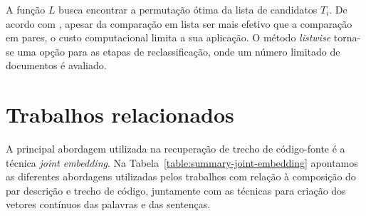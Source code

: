 A função $L$ busca encontrar a permutação ótima da lista de candidatos $T_{i}$. De acordo com \cite{guo-deep-look-into-neural-ranking-models:2019}, apesar da comparação em lista ser mais efetivo que a comparação em pares, o custo computacional limita a sua aplicação. O método \textit{listwise} torna-se uma opção para as etapas de reclassificação, onde um número limitado de documentos é avaliado. 

\section{Trabalhos relacionados}\label{sec:code-retrieval-trabalhos-relacionados}

A principal abordagem utilizada na recuperação de trecho de código-fonte é a técnica \textit{joint embedding}. Na Tabela~\ref{table:summary-joint-embedding} apontamos as diferentes abordagens utilizadas pelos trabalhos com relação à composição do par descrição e trecho de código, juntamente com as técnicas para criação dos vetores contínuos das palavras e das sentenças.


